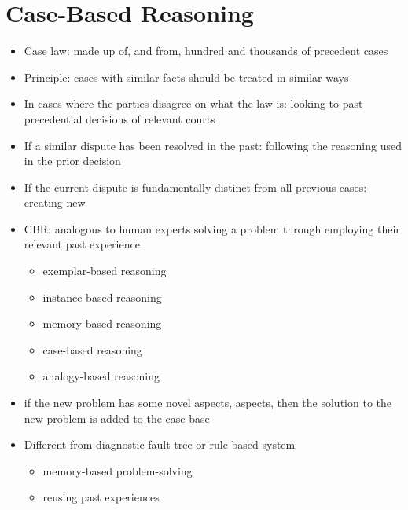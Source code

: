 \section{Case-Based Reasoning}
\begin{itemize}
\item Case law: made up of, and from, hundred and thousands of precedent cases
\item Principle: cases with similar facts should be treated in similar ways 
\item In cases where the parties disagree on what the law is: looking to past precedential decisions of relevant courts
\item If a similar dispute has been resolved in the past: following the reasoning used in the prior decision
\item If the current dispute is fundamentally distinct from all previous cases: creating new 
\item CBR: analogous to human experts solving a problem through employing their relevant past experience
\begin{itemize}
\item exemplar-based reasoning
\item instance-based reasoning
\item memory-based reasoning
\item case-based reasoning
\item analogy-based reasoning
\end{itemize}
\item if the new problem has some novel aspects, aspects, then the solution to the new problem is added to the case base
\item Different from diagnostic fault tree or rule-based system
\begin{itemize}
\item memory-based problem-solving
\item reusing past experiences
\end{itemize}
\end{itemize}

